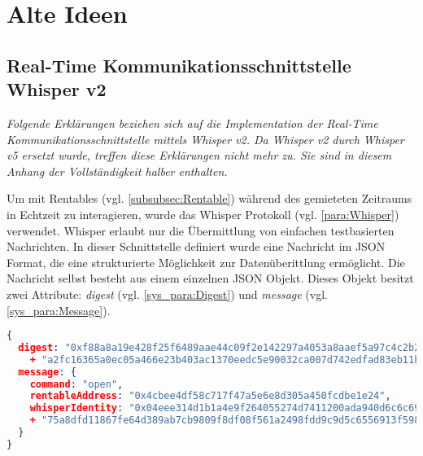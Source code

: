 \chapter{Alte Ideen}

\section{Real-Time Kommunikationsschnittstelle Whisper v2}
\emph{Folgende Erklärungen beziehen sich auf die Implementation der Real-Time Kommunikationsschnittstelle mittels Whisper v2. Da Whisper v2 durch Whisper v5 ersetzt wurde, treffen diese Erklärungen nicht mehr zu. Sie sind in diesem Anhang der Vollständigkeit halber enthalten.}

Um mit Rentables (vgl. \ref{subsubsec:Rentable}) während des gemieteten Zeitraums in Echtzeit zu interagieren, wurde das Whisper Protokoll (vgl. \ref{para:Whisper}) verwendet. Whisper erlaubt nur die Übermittlung von einfachen testbasierten Nachrichten. In dieser Schnittstelle definiert wurde eine Nachricht im \acrshort{JSON} Format, die eine strukturierte Möglichkeit zur Datenüberittlung ermöglicht.
Die Nachricht selbst besteht aus einem einzelnen JSON Objekt. Dieses Objekt besitzt zwei Attribute: \emph{digest} (vgl. \ref{sys_para:Digest}) und \emph{message} (vgl. \ref{sys_para:Message}).

\begin{lstlisting}[language=json,caption={Beispiel einer Real-Time Nachricht via Whisper Protokoll}]
{
  digest: "0xf88a8a19e428f25f6489aae44c09f2e142297a4053a8aaef5a97c4c2b246c89477"
    + "a2fc16365a0ec05a466e23b403ac1370eedc5e90032ca007d742edfad83eb11b",
  message: {
    command: "open",
    rentableAddress: "0x4cbee4df58c717f47a5e6e8d305a450fcdbe1e24",
    whisperIdentity: "0x04eee314d1b1a4e9f264055274d7411200ada940d6c6c698d53bf40b41ff0f5277"
    + "75a8dfd11867fe64d389ab7cb9809f8df08f561a2498fdd9c9d5c6556913f598"
  }
}
\end{lstlisting}

